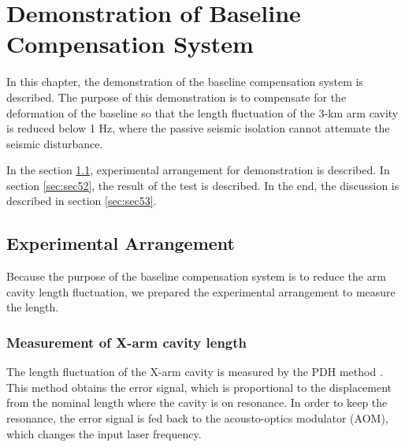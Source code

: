 \chapter{Demonstration of Baseline Compensation System} \label{chap5}
In this chapter, the demonstration of the baseline compensation system is described. The purpose of this demonstration is to compensate for the deformation of the baseline so that the length fluctuation of the 3-km arm cavity is reduced below 1 Hz, where the passive seismic isolation cannot attenuate the seismic disturbance. 

In the section \cref{sec:sec51}, experimental arrangement for demonstration is described. In section \cref{sec:sec52}, the result of the test is described. In the end, the discussion is described in section \cref{sec:sec53}.

\section{Experimental Arrangement} \label{sec:sec51}
Because the purpose of the baseline compensation system is to reduce the arm cavity length fluctuation, we prepared the experimental arrangement to measure the length.

\subsection{Measurement of X-arm cavity length}
The length fluctuation of the X-arm cavity is measured by the PDH method \cite{drever1983laser}. This method obtains the error signal, which is proportional to the displacement from the nominal length where the cavity is on resonance. In order to keep the resonance, the error signal is fed back to the acousto-optics modulator (AOM), which changes the input laser frequency.

